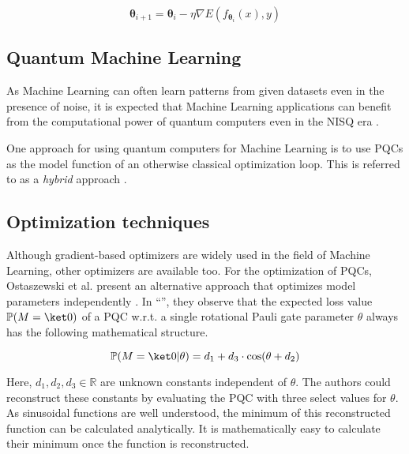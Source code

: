 \begin{equation}
    \mathbf{\theta}_{i+1} = \mathbf{\theta}_i - \eta\nabla E(f_{\mathbf{\theta}_i}(x), y)
\end{equation}


\subsection{Quantum Machine Learning}
\label{sec:real-qml-intro}

As Machine Learning can often learn patterns from given datasets even in the
presence of noise, it is expected that Machine Learning applications can benefit
from the computational power of quantum computers even in the NISQ era
\cite{ciliberto_quantum_2018,cerezo_variational_2021}.

One approach for using quantum computers for Machine Learning is to use
PQCs as the model function of an otherwise classical optimization loop.
This is referred to as a \emph{hybrid} approach
\cite{benedetti_parameterized_2019,mitarai_quantum_2018}.


\subsection{Optimization techniques}
\label{sec:optimizers}

Although gradient-based optimizers are widely used in the field of Machine
Learning, other optimizers are available too.
For the optimization of PQCs, Ostaszewski et al. present an alternative approach
that optimizes model parameters independently \cite{ostaszewski_structure_2021}.
In ``\emph{}'', they observe that
the expected loss value $\mathbb P(M = \ket 0)$ of a PQC w.r.t. a single
rotational Pauli gate parameter $\theta$ always has the following mathematical
structure.

\begin{equation}
    \mathbb{P}(M = \ket 0 | \theta) = d_1 + d_3 \cdot \cos(\theta + d_2)
\end{equation}

Here, $d_1, d_2, d_3 \in \mathbb R$ are unknown constants independent of $\theta$.
The authors could reconstruct these constants by evaluating the PQC with three
select values for $\theta$.
As sinusoidal functions are well understood, the minimum of this reconstructed
function can be calculated analytically.
It is mathematically easy to
calculate their minimum once the function is reconstructed.
